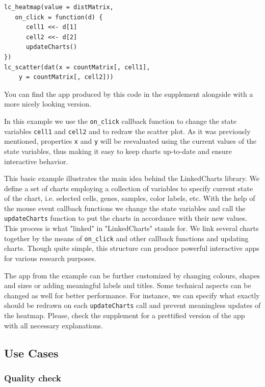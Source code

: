 \documentclass[twocolumn,10pt]{article}
\begin{document}
\begin{verbatim}
lc_heatmap(value = distMatrix, 
   on_click = function(d) {
      cell1 <<- d[1]
      cell2 <<- d[2]
      updateCharts()
})
lc_scatter(dat(x = countMatrix[, cell1],
	y = countMatrix[, cell2]))
\end{verbatim}

You can find the app produced by this code in the supplement alongside with a more nicely looking version.

In this example we use the \texttt{on_click} callback function to change the state variables \texttt{cell1} and \texttt{cell2} and to redraw the scatter plot. As it was previously mentioned, properties \texttt{x} and \texttt{y} will be reevaluated using the current values of the state variables, thus making it easy to keep charts up-to-date and ensure interactive behavior.

This basic example illustrates the main idea behind the LinkedCharts library. We define a set of charts employing a collection of variables to specify current state of the chart, i.e. selected cells, genes, samples, color labels, etc. With the help of the mouse event callback functions we change the state variables and call the \texttt{updateCharts} function to put the charts in accordance with their new values. This process is what "linked" in "LinkedCharts" stands for. We link several charts together by the means of \texttt{on_click} and other callback functions and updating charts. Though quite simple, this structure can produce powerful interactive apps for various research purposes.

The app from the example can be further customized by changing colours, shapes and sizes or adding meaningful labels and titles. Some technical aspects can be changed as well for better performance. For instance, we can specify what exactly should be redrawn on each \texttt{updateCharts} call and prevent meaningless updates of the heatmap. Please, check the supplement for a prettified version of the app with all necessary explanations.

\subsection{Use Cases}
\subsubsection{Quality check}
\end{document}
